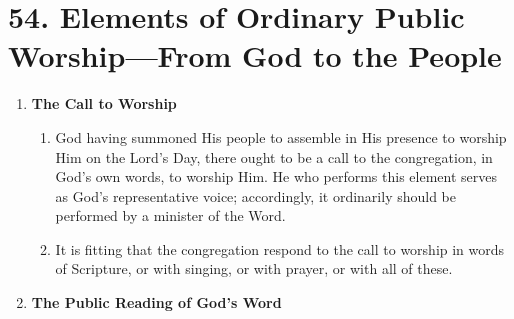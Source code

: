 \documentclass[
]{book}
\providecommand{\tightlist}{%
  \setlength{\itemsep}{0pt}\setlength{\parskip}{0pt}}
\begin{document}
\hypertarget{elements-of-ordinary-public-worshipfrom-god-to-the-people}{%
\section*{54. Elements of Ordinary Public Worship---From God to the People}\label{elements-of-ordinary-public-worshipfrom-god-to-the-people}}

\protect\hypertarget{chapter-slug-54-elements-of-ordinary-public-worship-from-god-to-the-people}{\href{}{}}

\begin{enumerate}
\def\labelenumi{\arabic{enumi}.}
\tightlist
\item
  \protect\hypertarget{54}{\href{}{}}\textbf{The Call to Worship}

  \begin{enumerate}
  \def\labelenumii{\alph{enumii}.}
  \tightlist
  \item
    God having summoned His people to assemble in His presence to worship Him on the Lord's Day, there ought to be a call to the congregation, in God's own words, to worship Him. He who performs this element serves as God's representative voice; accordingly, it ordinarily should be performed by a minister of the Word.
  \item
    It is fitting that the congregation respond to the call to worship in words of Scripture, or with singing, or with prayer, or with all of these.
  \end{enumerate}
\item
  \textbf{The Public Reading of God's Word}


\end{enumerate}
\end{document}
